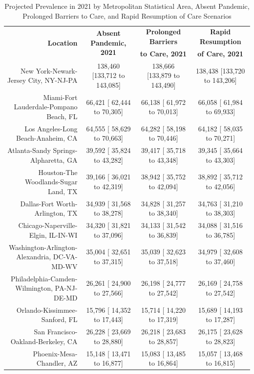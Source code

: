 \documentclass{article}
\begin{document}
\begin{table}[H]
	\caption{Projected Prevalence in 2021 by Metropolitan Statistical Area, Absent Pandemic, Prolonged Barriers to Care, and Rapid Resumption of Care Scenarios}
	\footnotesize
	\begin{tabular}{|r|c|c|c|}
		\hline
		\multirow{2}{*}{\textbf{Location}} & \multirow{2}{*}{\textbf{Absent Pandemic, 2021}} & \textbf{Prolonged Barriers} & \textbf{Rapid Resumption}\\
		&  & \textbf{to Care, 2021} & \textbf{of Care, 2021}\\
		\hline\hline
		New York-Newark-Jersey City, NY-NJ-PA & 138,460 [133,712 to 143,085] & 138,666 [133,879 to 143,490] & 138,438 [133,720 to 143,206]\\
		Miami-Fort Lauderdale-Pompano Beach, FL &  66,421 [ 62,444 to  70,305] &  66,138 [ 61,972 to  70,013] &  66,058 [ 61,984 to  69,933]\\
		Los Angeles-Long Beach-Anaheim, CA &  64,555 [ 58,629 to  70,663] &  64,282 [ 58,198 to  70,446] &  64,182 [ 58,035 to  70,271]\\
		Atlanta-Sandy Springs-Alpharetta, GA &  39,592 [ 35,824 to  43,282] &  39,417 [ 35,718 to  43,348] &  39,345 [ 35,664 to  43,303]\\
		Houston-The Woodlands-Sugar Land, TX &  39,166 [ 36,021 to  42,319] &  38,942 [ 35,752 to  42,094] &  38,892 [ 35,712 to  42,056]\\
		Dallas-Fort Worth-Arlington, TX &  34,939 [ 31,568 to  38,278] &  34,828 [ 31,257 to  38,340] &  34,763 [ 31,210 to  38,303]\\
		Chicago-Naperville-Elgin, IL-IN-WI &  34,320 [ 31,821 to  37,096] &  34,133 [ 31,542 to  36,839] &  34,088 [ 31,516 to  36,785]\\
		Washington-Arlington-Alexandria, DC-VA-MD-WV &  35,004 [ 32,651 to  37,315] &  35,039 [ 32,623 to  37,518] &  34,979 [ 32,608 to  37,460]\\
		Philadelphia-Camden-Wilmington, PA-NJ-DE-MD &  26,261 [ 24,900 to  27,566] &  26,198 [ 24,777 to  27,542] &  26,169 [ 24,758 to  27,542]\\
		Orlando-Kissimmee-Sanford, FL &  15,796 [ 14,352 to  17,443] &  15,714 [ 14,220 to  17,319] &  15,689 [ 14,193 to  17,287]\\
		San Francisco-Oakland-Berkeley, CA &  26,228 [ 23,669 to  28,880] &  26,218 [ 23,683 to  28,857] &  26,175 [ 23,628 to  28,823]\\
		Phoenix-Mesa-Chandler, AZ &  15,148 [ 13,471 to  16,877] &  15,083 [ 13,485 to  16,864] &  15,057 [ 13,468 to  16,815]\\

\end{tabular}
\end{table}
\end{document}
